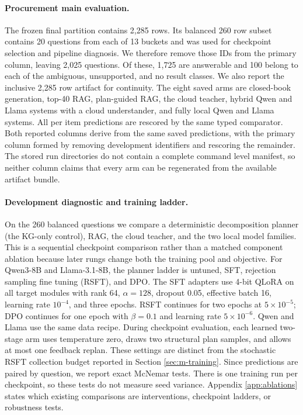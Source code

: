 \paragraph{Procurement main evaluation.}
The frozen final partition contains 2,285 rows.  Its balanced 260 row subset contains 20 questions
from each of 13 buckets and was used for checkpoint selection and pipeline diagnosis.  We therefore
remove those IDs from the primary column, leaving 2,025 questions.  Of these, 1,725 are answerable
and 100 belong to each of the ambiguous, unsupported, and no result classes.  We also report the
inclusive 2,285 row artifact for continuity.  The
eight saved arms are closed-book generation, top-40 RAG, plan-guided RAG, the cloud teacher, hybrid
Qwen and Llama systems with a cloud understander, and fully local Qwen and Llama systems.  All
per item predictions are rescored by the same typed comparator.  Both reported columns derive from
the same saved predictions, with the primary column formed by removing development identifiers and
rescoring the remainder.  The stored run directories do not contain a complete command level
manifest, so neither column claims that every arm can be regenerated from the available artifact
bundle.

\paragraph{Development diagnostic and training ladder.}
On the 260 balanced questions we compare a deterministic decomposition planner (the KG-only
control), RAG, the cloud teacher, and the two local model families.  This is a sequential
checkpoint comparison rather than a matched component ablation because later rungs change both the
training pool and objective.  For Qwen3-8B and Llama-3.1-8B, the planner ladder is untuned, SFT,
rejection sampling fine tuning (RSFT), and DPO.  The SFT adapters use 4-bit QLoRA
on all target modules with rank 64, $\alpha=128$, dropout 0.05, effective batch 16, learning rate
$10^{-4}$, and three epochs.  RSFT continues for two epochs at $5\times10^{-5}$; DPO continues for
one epoch with $\beta=0.1$ and learning rate $5\times10^{-6}$.  Qwen and Llama use the same data
recipe.  During checkpoint evaluation, each learned two-stage arm uses temperature zero, draws two
structural plan samples, and allows at most one feedback replan.  These settings are distinct from
the stochastic RSFT collection budget reported in Section \ref{sec:m-training}.  Since predictions
are paired by question, we report exact McNemar tests.  There
is one training run per checkpoint, so these tests do not measure seed variance.  Appendix
\ref{app:ablations} states which existing comparisons are interventions, checkpoint ladders, or
robustness tests.

